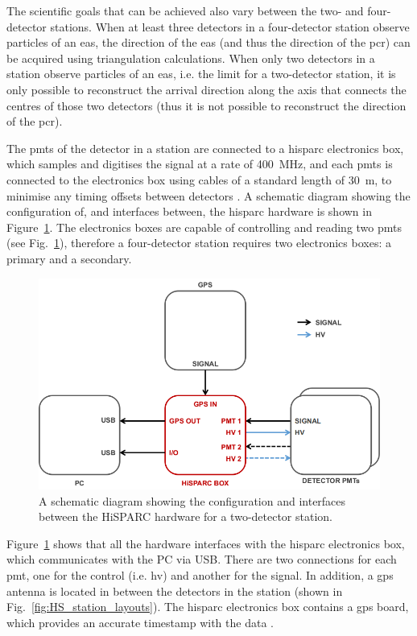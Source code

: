 The scientific goals that can be achieved also vary between the two- and four-detector stations. When at least three detectors in a four-detector station observe particles of an \gls{eas}, the direction of the \gls{eas} (and thus the direction of the \gls{pcr}) can be acquired using triangulation calculations. When only two detectors in a station observe particles of an \gls{eas}, i.e. the limit for a two-detector station, it is only possible to reconstruct the arrival direction along the axis that connects the centres of those two detectors (thus it is not possible to reconstruct the direction of the \gls{pcr}).

The \glspl{pmt} of the detector in a station are connected to a \gls{hisparc} electronics box, which samples and digitises the signal at a rate of 400~MHz, and each \glspl{pmt} is connected to the electronics box using cables of a standard length of 30~m, to minimise any timing offsets between detectors \citep{fokkema_hisparc_2012, van_dam_hisparc_2020}. A schematic diagram showing the configuration of, and interfaces between, the \gls{hisparc} hardware is shown in Figure~\ref{fig:HS_hardware_config}. The electronics boxes are capable of controlling and reading two \glspl{pmt} (see Fig.~\ref{fig:HS_hardware_config}), therefore a four-detector station requires two electronics boxes: a primary and a secondary.


\begin{figure}[ht!]
	\centering
	\includegraphics[width=\columnwidth]{HS_hardware_config.png}
	\caption{A schematic diagram showing the configuration and interfaces between the HiSPARC hardware for a two-detector station.}
	\label{fig:HS_hardware_config}
\end{figure}

Figure~\ref{fig:HS_hardware_config} shows that all the hardware interfaces with the \gls{hisparc} electronics box, which communicates with the PC via USB. There are two connections for each \gls{pmt}, one for the control (i.e. \gls{hv}) and another for the signal. In addition, a \gls{gps} antenna is located in between the detectors in the station (shown in Fig.~\ref{fig:HS_station_layouts}). The \gls{hisparc} electronics box contains a \gls{gps} board, which provides an accurate timestamp with the data \citep{fokkema_hisparc_2012}.



